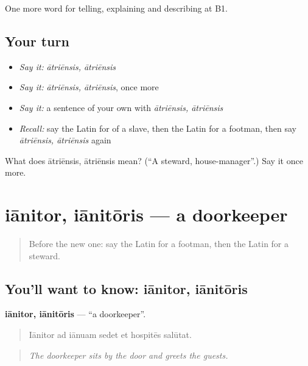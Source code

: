 \begin{grammarlens}[title={What you've built}]
One more word for telling, explaining and describing at B1.
\end{grammarlens}

\subsection*{Your turn}
\begin{itemize}
\raggedright
  \item \emph{Say it:} \emph{ātriēnsis, ātriēnsis}
  \item \emph{Say it:} \emph{ātriēnsis, ātriēnsis}, once more
  \item \emph{Say it:} a sentence of your own with \emph{ātriēnsis, ātriēnsis}
  \item \emph{Recall:} say the Latin for of a slave, then the Latin for a footman, then say \emph{ātriēnsis, ātriēnsis} again
\end{itemize}

\begin{tcolorbox}[breakable,colback=teal!4,colframe=teal!35!black,title={Before you move on}]
What does ātriēnsis, ātriēnsis mean? (\textquotedblleft{}A steward, house-manager\textquotedblright{}.) Say it once more.
\end{tcolorbox}
\section[iānitor, iānitōris]{iānitor, iānitōris — a doorkeeper}

\label{lesson:LA-C531-ianitor}



\begin{quote}
Before the new one: say the Latin for a footman, then the Latin for a steward.
\end{quote}

\subsection*{You'll want to know: iānitor, iānitōris}
\textbf{iānitor, iānitōris} — \textquotedblleft{}a doorkeeper\textquotedblright{}.

\begin{quote}
Iānitor ad iānuam sedet et hospitēs salūtat.
\end{quote}

\begin{quote}
\emph{The doorkeeper sits by the door and greets the guests.}
\end{quote}


